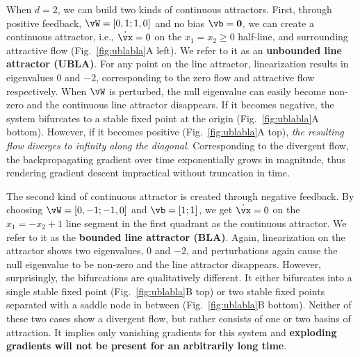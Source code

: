 \documentclass{article}
\newcounter{ct}
\theoremstyle{definition}
\theoremstyle{remark}
\begin{document}
When $d=2$, we can build two kinds of continuous attractors.
First, through positive feedback, $\vW = [0, 1; 1, 0]$ and no bias $\vb = \mathbf{0}$, we can create a continuous attractor, i.e., $\dot{\vx} = 0$ on the $x_1 = x_2 \geq 0$ half-line, and surrounding attractive flow (Fig.~\ref{fig:ublabla}A left).
We refer to it as an \textbf{unbounded line attractor (UBLA)}.
For any point on the line attractor, linearization results in eigenvalues $0$ and $-2$, corresponding to the zero flow and attractive flow respectively.
When $\vW$ is perturbed, the null eigenvalue can easily become non-zero and the continuous line attractor disappears.
If it becomes negative, the system bifurcates to a stable fixed point at the origin (Fig.~\ref{fig:ublabla}A bottom).
However, if it becomes positive (Fig.~\ref{fig:ublabla}A top), \emph{the resulting flow diverges to infinity along the diagonal}.
Corresponding to the divergent flow, the backpropagating gradient over time exponentially grows in magnitude, thus rendering gradient descent impractical without truncation in time.

The second kind of continuous attractor is created through negative feedback.
By choosing $\vW = [0, -1; -1, 0]$ and $\vb = [1; 1]$, we get $\dot{\vx} = 0$ on the $x_1 = -x_2 + 1$ line segment in the first quadrant as the continuous attractor.
We refer to it as the \textbf{bounded line attractor (BLA)}.
Again, linearization on the attractor shows two eigenvalues, $0$ and $-2$, and perturbations again cause the null eigenvalue to be non-zero and the line attractor disappears.
However, surprisingly, the bifurcations are  qualitatively different.
It either bifurcates into a single stable fixed point (Fig.~\ref{fig:ublabla}B top) or two stable fixed points separated with a saddle node in between (Fig.~\ref{fig:ublabla}B bottom).
Neither of these two cases show a divergent flow, but rather consists of one or two basins of attraction.
It implies only vanishing gradients for this system and \textbf{exploding gradients will not be present for an arbitrarily long time}.
\end{document}
